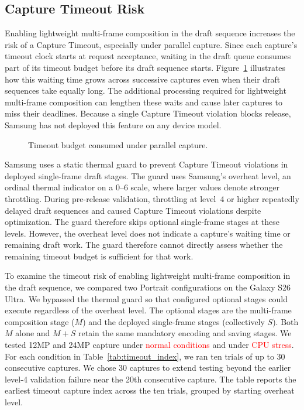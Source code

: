\subsection{Capture Timeout Risk}
\label{sec:capture-timeout-risk}
\label{sec:guard-limit}

Enabling lightweight multi-frame composition in the draft sequence increases the risk of a Capture Timeout, especially under parallel capture.
Since each capture's timeout clock starts at request acceptance, waiting in the draft queue consumes part of its timeout budget before its draft sequence starts.
Figure~\ref{fig:overlap} illustrates how this waiting time grows across successive captures even when their draft sequences take equally long.
The additional processing required for lightweight multi-frame composition can lengthen these waits and cause later captures to miss their deadlines.
Because a single Capture Timeout violation blocks release, Samsung has not deployed this feature on any device model.

\begin{figure}[t]
  \centering
  \resizebox{\columnwidth}{!}{}
  \caption{Timeout budget consumed under parallel capture.}
  \label{fig:overlap}
\end{figure}

Samsung uses a static thermal guard to prevent Capture Timeout violations in deployed single-frame draft stages.
The guard uses Samsung's overheat level, an ordinal thermal indicator on a 0--6 scale, where larger values denote stronger throttling.
During pre-release validation, throttling at level~4 or higher repeatedly delayed draft sequences and caused Capture Timeout violations despite optimization.
The guard therefore skips optional single-frame stages at these levels.
However, the overheat level does not indicate a capture's waiting time or remaining draft work.
The guard therefore cannot directly assess whether the remaining timeout budget is sufficient for that work.

To examine the timeout risk of enabling lightweight multi-frame composition in the draft sequence, we compared two Portrait configurations on the Galaxy S26 Ultra.
We bypassed the thermal guard so that configured optional stages could execute regardless of the overheat level.
The optional stages are the multi-frame composition stage (\(M\)) and the deployed single-frame stages (collectively \(S\)).
Both \(M\) alone and \(M+S\) retain the same mandatory encoding and saving stages.
We tested 12MP and 24MP capture under \textcolor{red}{normal conditions} and under \textcolor{red}{CPU stress}.
For each condition in Table~\ref{tab:timeout_index}, we ran ten trials of up to 30 consecutive captures.
We chose 30 captures to extend testing beyond the earlier level-4 validation failure near the 20th consecutive capture.
The table reports the earliest timeout capture index across the ten trials, grouped by starting overheat level.

